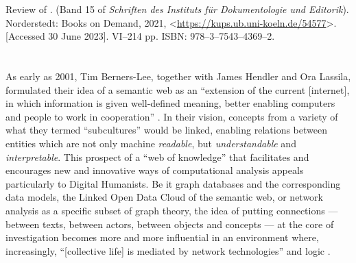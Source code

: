 



\begin{review}
\renewcommand*{\pagemark}{}



\begin{reviewed}
Review of \thecontribution. (Band 15 of \textit{Schriften des Instituts für Dokumentologie und Editorik}). Norderstedt: Books on Demand, 2021, <\href{https://kups.ub.uni-koeln.de/54577}{https://kups.ub.uni-koeln.de/54577}>. [Accessed 30 June 2023]. VI–214 pp. ISBN: 978–3–7543–4369–2.
\end{reviewed}



\section*{} 
As early as 2001, Tim Berners-Lee, together with James Hendler and Ora
Lassila, formulated their idea of a semantic web as an ``extension of the
current {[}internet{]}, in which information is given well-defined
meaning, better enabling computers and people to work in cooperation'' \parencite{berners-lee_semantic_2001}. In their vision, concepts from a variety of
what they termed ``subcultures'' would be linked, enabling relations
between entities which are not only machine \emph{readable}, but
\emph{understandable} and \emph{interpretable}. This prospect of a ``web
of knowledge'' that facilitates and encourages new and innovative ways
of computational analysis appeals particularly to Digital Humanists. Be
it graph databases and the corresponding data models, the Linked Open
Data Cloud of the semantic web, or network analysis as a specific subset
of graph theory, the idea of putting connections --- between texts,
between actors, between objects and concepts --- at the core of
investigation becomes more and more influential in an environment where,
increasingly, ``{[}collective life{]} is mediated by network
technologies'' and logic \parencite[513]{venturini_actor-network_2019}.


\end{review}

